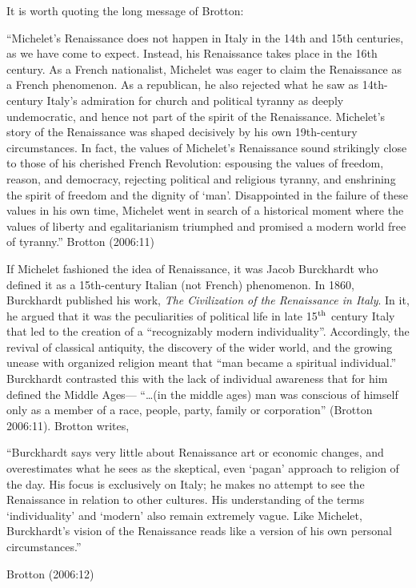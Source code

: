 It is worth quoting the long message of Brotton: 
\begin{myquote} 
“Michelet’s Renaissance does not happen in Italy in the 14th and 15th centuries, as we have come to expect. Instead, his Renaissance takes place in the 16th century. As a French nationalist, Michelet was eager to claim the Renaissance as a French phenomenon. As a republican, he also rejected what he saw as 14th-century Italy’s admiration for church and political tyranny as deeply undemocratic, and hence not part of the spirit of the Renaissance. Michelet’s story of the Renaissance was shaped decisively by his own 19th-century circumstances. In fact, the values of Michelet’s Renaissance sound strikingly close to those of his cherished French Revolution: espousing the values of freedom, reason, and democracy, rejecting political and religious tyranny, and enshrining the spirit of freedom and the dignity of ‘man’. Disappointed in the failure of these values in his own time, Michelet went in search of a historical moment where the values of liberty and egalitarianism triumphed and promised a modern world free of tyranny.”	\hfill{Brotton (2006:11)}
\end{myquote}

\newpage

If Michelet fashioned the idea of Renaissance, it was Jacob Burckhardt who defined it as a 15th-century Italian (not French) phenomenon. In 1860, Burckhardt published his work, {\sl The Civilization of the Renaissance in Italy}. In it, he argued that it was the peculiarities of political life in late 15$^{\rm th}$ century Italy that led to the creation of a “recognizably modern individuality”. Accordingly, the revival of classical antiquity, the discovery of the wider world, and the growing unease with organized religion meant that “man became a spiritual individual.” Burckhardt contrasted this with the lack of individual awareness that for him defined the Middle Ages—  “…(in the middle ages) man was conscious of himself only as a member of a race, people, party, family or corporation” (Brotton 2006:11). Brotton writes,
\begin{myquote}
“Burckhardt says very little about Renaissance art or economic changes, and overestimates what he sees as the skeptical, even ‘pagan’ approach to religion of the day. His focus is exclusively on Italy; he makes no attempt to see the Renaissance in relation to other cultures. His understanding of the terms ‘individuality’ and ‘modern’ also remain extremely vague. Like Michelet, Burckhardt’s vision of the Renaissance reads like a version of his own personal circumstances.”  

\hfill{Brotton (2006:12)}
\end{myquote}

